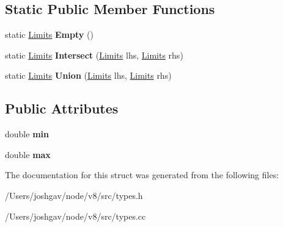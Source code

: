 \subsection*{Static Public Member Functions}
\begin{DoxyCompactItemize}
\item 
static \hyperlink{structv8_1_1internal_1_1_range_type_1_1_limits}{Limits} {\bfseries Empty} ()\hypertarget{structv8_1_1internal_1_1_range_type_1_1_limits_a5d9753fae3ca6d02340c18b57ff2830a}{}\label{structv8_1_1internal_1_1_range_type_1_1_limits_a5d9753fae3ca6d02340c18b57ff2830a}

\item 
static \hyperlink{structv8_1_1internal_1_1_range_type_1_1_limits}{Limits} {\bfseries Intersect} (\hyperlink{structv8_1_1internal_1_1_range_type_1_1_limits}{Limits} lhs, \hyperlink{structv8_1_1internal_1_1_range_type_1_1_limits}{Limits} rhs)\hypertarget{structv8_1_1internal_1_1_range_type_1_1_limits_a02cd247e2d75155a109d74803d6adbb6}{}\label{structv8_1_1internal_1_1_range_type_1_1_limits_a02cd247e2d75155a109d74803d6adbb6}

\item 
static \hyperlink{structv8_1_1internal_1_1_range_type_1_1_limits}{Limits} {\bfseries Union} (\hyperlink{structv8_1_1internal_1_1_range_type_1_1_limits}{Limits} lhs, \hyperlink{structv8_1_1internal_1_1_range_type_1_1_limits}{Limits} rhs)\hypertarget{structv8_1_1internal_1_1_range_type_1_1_limits_a893e60557603d355a29683ea79e4c30e}{}\label{structv8_1_1internal_1_1_range_type_1_1_limits_a893e60557603d355a29683ea79e4c30e}

\end{DoxyCompactItemize}
\subsection*{Public Attributes}
\begin{DoxyCompactItemize}
\item 
double {\bfseries min}\hypertarget{structv8_1_1internal_1_1_range_type_1_1_limits_a0e25c78b88b126864d44e491c7dd4ec1}{}\label{structv8_1_1internal_1_1_range_type_1_1_limits_a0e25c78b88b126864d44e491c7dd4ec1}

\item 
double {\bfseries max}\hypertarget{structv8_1_1internal_1_1_range_type_1_1_limits_aa4660f11dc950f94e32016a9ae6ac4a6}{}\label{structv8_1_1internal_1_1_range_type_1_1_limits_aa4660f11dc950f94e32016a9ae6ac4a6}

\end{DoxyCompactItemize}


The documentation for this struct was generated from the following files\+:\begin{DoxyCompactItemize}
\item 
/\+Users/joshgav/node/v8/src/types.\+h\item 
/\+Users/joshgav/node/v8/src/types.\+cc\end{DoxyCompactItemize}
